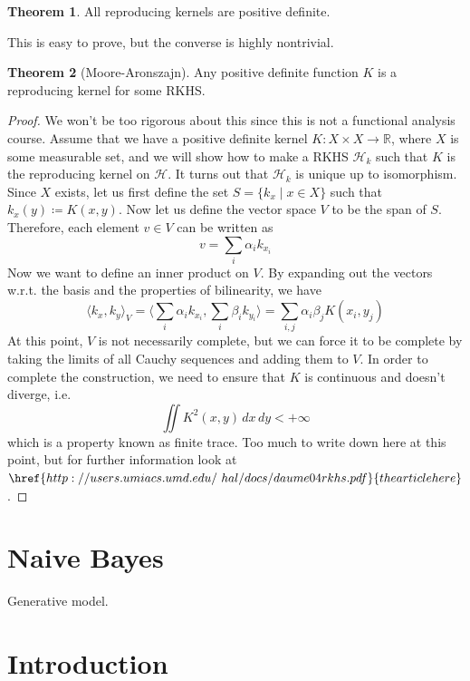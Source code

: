 \documentclass{article}
\theoremstyle{definition}
\newtheorem{theorem}{Theorem}[section]
\begin{document}
  \begin{theorem} 
   All reproducing kernels are positive definite.  
  \end{theorem} 

  This is easy to prove, but the converse is highly nontrivial. 

  \begin{theorem}[Moore-Aronszajn] 
    Any positive definite function $K$ is a reproducing kernel for some RKHS.  
  \end{theorem} 
  \begin{proof} 
    We won't be too rigorous about this since this is not a functional analysis course. Assume that we have a positive definite kernel $K: X \times X \rightarrow \mathbb{R}$, where $X$ is some measurable set, and we will show how to make a RKHS $\mathcal{H}_k$ such that $K$ is the reproducing kernel on $\mathcal{H}$. It turns out that $\mathcal{H}_k$ is unique up to isomorphism. Since $X$ exists, let us first define the set $S = \{ k_x \mid x \in X\}$ such that $k_x (y) \coloneqq K(x, y)$. Now let us define the vector space $V$ to be the span of $S$. Therefore, each element $v \in V$ can be written as 
    \[v = \sum_i \alpha_i k_{x_i}\]
    Now we want to define an inner product on $V$. By expanding out the vectors w.r.t. the basis and the properties of bilinearity, we have 
    \[\langle k_x, k_y \rangle_{V} = \bigg\langle \sum_i \alpha_i k_{x_i} , \sum_i \beta_i k_{y_i} \bigg\rangle = \sum_{i, j} \alpha_i \beta_j K(x_i, y_j)\] 
    At this point, $V$ is not necessarily complete, but we can force it to be complete by taking the limits of all Cauchy sequences and adding them to $V$. In order to complete the construction, we need to ensure that $K$ is continuous and doesn't diverge, i.e. 
    \[\iint K^2 (x, y) \,dx\,dy < +\infty\]
    which is a property known as finite trace. Too much to write down here at this point, but for further information look at $\href{http://users.umiacs.umd.edu/~hal/docs/daume04rkhs.pdf}{the article here}$. 
  \end{proof}

\section{Naive Bayes}

  Generative model. 

\section{Introduction}
\end{document}
